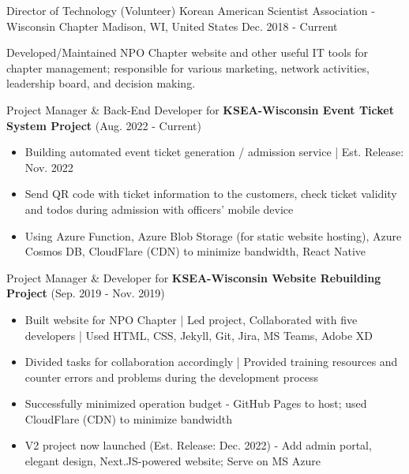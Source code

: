 

\begin{cventries}

  \cventry
  {Director of Technology (Volunteer)} %
  {Korean American Scientist Association - Wisconsin Chapter} %
  {Madison, WI, United States} %
  {Dec. 2018 - Current} %
  {
    \begin{cvitems} %
      \item {Developed/Maintained NPO Chapter website and other useful IT tools for chapter management; responsible for various marketing, network activities, leadership board, and decision making.}
      \item {Project Manager \& Back-End Developer for \textbf{KSEA-Wisconsin Event Ticket System Project} (Aug. 2022 - Current)}
      \begin{itemize}
        \item {Building automated event ticket generation / admission service | Est. Release: Nov. 2022}
        \item {Send QR code with ticket information to the customers, check ticket validity and todos during admission with officers' mobile device}
        \item {Using Azure Function, Azure Blob Storage (for static website hosting), Azure Cosmos DB, CloudFlare (CDN) to minimize bandwidth, React Native}
      \end{itemize}
      \item {Project Manager \& Developer for \textbf{KSEA-Wisconsin Website Rebuilding Project} (Sep. 2019 - Nov. 2019)}
      \begin{itemize}
        \item {Built website for NPO Chapter | Led project, Collaborated with five developers | Used HTML, CSS, Jekyll, Git, Jira, MS Teams, Adobe XD}
        \item {Divided tasks for collaboration accordingly | Provided training resources and counter errors and problems during the development process}
        \item {Successfully minimized operation budget - GitHub Pages to host; used CloudFlare (CDN) to minimize bandwidth}
        \item {V2 project now launched (Est. Release: Dec. 2022) - Add admin portal, elegant design, Next.JS-powered website; Serve on MS Azure}
      \end{itemize}
    \end{cvitems}
  }


\end{cventries}
